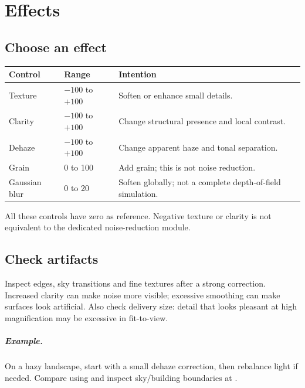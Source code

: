 \chapter{Effects}
\section{Choose an effect}
\begin{longtable}{@{}L{3.6cm}L{2.8cm}L{7.2cm}@{}}
\toprule Control & Range & Intention\\\midrule\endhead
Texture & $-100$ to $+100$ & Soften or enhance small details.\\
Clarity & $-100$ to $+100$ & Change structural presence and local contrast.\\
Dehaze & $-100$ to $+100$ & Change apparent haze and tonal separation.\\
Grain & 0 to 100 & Add grain; this is not noise reduction.\\
Gaussian blur & 0 to 20 & Soften globally; not a complete depth-of-field simulation.\\
\bottomrule
\end{longtable}
All these controls have zero as reference. Negative texture or clarity is
not equivalent to the dedicated noise-reduction module.

\section{Check artifacts}
Inspect edges, sky transitions and fine textures after a strong correction.
Increased clarity can make noise more visible; excessive smoothing can make
surfaces look artificial. Also check delivery size: detail that looks pleasant
at high magnification may be excessive in fit-to-view.

\paragraph{Example.}
On a hazy landscape, start with a small dehaze correction, then rebalance
light if needed. Compare using  and inspect sky/building
boundaries at .
\gestesreglages
